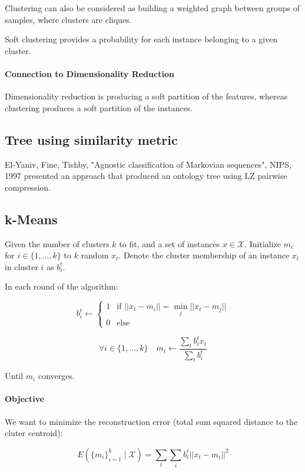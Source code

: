 \documentclass{idc_msc}
\begin{document}
Clustering can also be considered as building a weighted graph between groups of samples, where clusters are cliques.

Soft clustering provides a probability for each instance belonging to a given cluster.

\paragraph{Connection to Dimensionality Reduction}

Dimensionality reduction is producing a soft partition of the features, whereas clustering produces a soft partition of the instances.

\subsection{Tree using similarity metric}

El-Yaniv, Fine, Tishby, "Agnostic classification of Markovian sequences", NIPS, 1997 presented an approach that produced an ontology tree using LZ pairwise compression.

\subsection{k-Means}

Given the number of clusters \(k\) to fit, and a set of instances \(x \in \mathcal{X}\).
Initialize \(m_i\) for \(i \in \{1,\ldots,k\}\) to \(k\) random \(x_t\).
Denote the cluster membership of an instance \(x_t\) in cluster \(i\) as \(b_i^t\).

In each round of the algorithm:

\[
b_i^t \gets \begin{cases}
1 & \text{if \(||x_t - m_i|| = \min_j ||x_t - m_j||\)} \\
0 & \text{else}
\end{cases}
\]

\[\forall i \in \{1,\ldots,k\} \quad m_i \gets \frac{\sum_t b_i^t x_t}{\sum_t b_i^t}\]

Until \(m_i\) converges.

\paragraph{Objective}

We want to minimize the reconstruction error (total sum squared distance to the cluter centroid):

\[E(\{m_i\}_{i=1}^k \mid \mathcal{X}) = \sum_t \sum_i b_i^t ||x_t - m_i||^2\]
\end{document}
